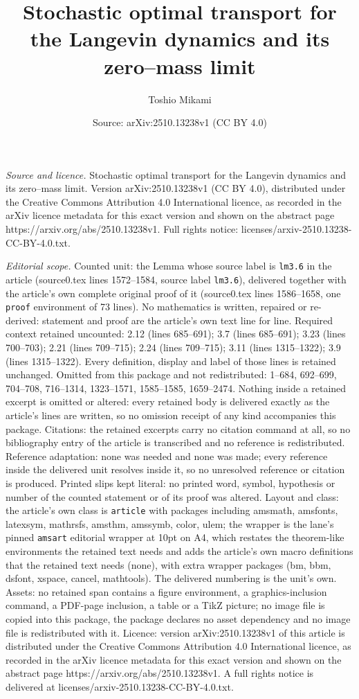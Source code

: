 \documentclass[10pt,a4paper]{amsart}
\title[Stochastic optimal transport for the Langevin dynamics and i]{Stochastic optimal transport for the Langevin dynamics and its zero--mass limit}
\author{Toshio Mikami}
\date{Source: arXiv:2510.13238v1 (CC BY 4.0)}
\begin{document}
\maketitle

\noindent\emph{Source and licence.} Stochastic optimal transport for the Langevin dynamics and its zero--mass limit. Version arXiv:2510.13238v1 (CC BY 4.0), distributed under the Creative Commons Attribution 4.0 International licence, as recorded in the arXiv licence metadata for this exact version and shown on the abstract page https://arxiv.org/abs/2510.13238v1. Full rights notice: licenses/arxiv-2510.13238-CC-BY-4.0.txt.\par\smallskip

\noindent\textit{Editorial scope.} Counted unit: the Lemma whose source label is \texttt{lm3.6} in the article (source0.tex lines 1572--1584, source label \texttt{lm3.6}), delivered together with the article's own complete original proof of it (source0.tex lines 1586--1658, one \texttt{proof} environment of 73 lines). No mathematics is written, repaired or re-derived: statement and proof are the article's own text line for line. Required context retained uncounted: 2.12 (lines 685--691); 3.7 (lines 685--691); 3.23 (lines 700--703); 2.21 (lines 709--715); 2.24 (lines 709--715); 3.11 (lines 1315--1322); 3.9 (lines 1315--1322). Every definition, display and label of those lines is retained unchanged. Omitted from this package and not redistributed: 1--684, 692--699, 704--708, 716--1314, 1323--1571, 1585--1585, 1659--2474. Nothing inside a retained excerpt is omitted or altered: every retained body is delivered exactly as the article's lines are written, so no omission receipt of any kind accompanies this package. Citations: the retained excerpts carry no citation command at all, so no bibliography entry of the article is transcribed and no reference is redistributed. Reference adaptation: none was needed and none was made; every reference inside the delivered unit resolves inside it, so no unresolved reference or citation is produced. Printed slips kept literal: no printed word, symbol, hypothesis or number of the counted statement or of its proof was altered. Layout and class: the article's own class is \texttt{article} with packages including amsmath, amsfonts, latexsym, mathrsfs, amsthm, amssymb, color, ulem; the wrapper is the lane's pinned \texttt{amsart} editorial wrapper at 10pt on A4, which restates the theorem-like environments the retained text needs and adds the article's own macro definitions that the retained text needs (none), with extra wrapper packages (bm, bbm, dsfont, xspace, cancel, mathtools). The delivered numbering is the unit's own. Assets: no retained span contains a figure environment, a graphics-inclusion command, a PDF-page inclusion, a table or a TikZ picture; no image file is copied into this package, the package declares no asset dependency and no image file is redistributed with it. Licence: version arXiv:2510.13238v1 of this article is distributed under the Creative Commons Attribution 4.0 International licence, as recorded in the arXiv licence metadata for this exact version and shown on the abstract page https://arxiv.org/abs/2510.13238v1. A full rights notice is delivered at licenses/arxiv-2510.13238-CC-BY-4.0.txt. 
\end{document}
